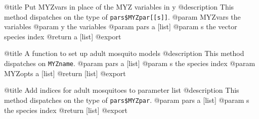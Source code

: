 \documentclass[
]{article}
\newenvironment{Shaded}{\begin{snugshade}}{\end{snugshade}}
\newcommand{\AttributeTok}[1]{\textcolor[rgb]{0.13,0.29,0.53}{#1}}
\newcommand{\ControlFlowTok}[1]{\textcolor[rgb]{0.13,0.29,0.53}{\textbf{#1}}}
\newcommand{\FunctionTok}[1]{\textcolor[rgb]{0.13,0.29,0.53}{\textbf{#1}}}
\newcommand{\NormalTok}[1]{#1}
\newcommand{\OtherTok}[1]{\textcolor[rgb]{0.56,0.35,0.01}{#1}}
\newcommand{\SpecialCharTok}[1]{\textcolor[rgb]{0.81,0.36,0.00}{\textbf{#1}}}
\newcommand{\StringTok}[1]{\textcolor[rgb]{0.31,0.60,0.02}{#1}}
\begin{document}
\begin{Shaded}
\end{Shaded}

@title Put MYZvars in place of the MYZ variables in y @description This
method dispatches on the type of \texttt{pars\$MYZpar{[}{[}s{]}{]}}.
@param MYZvars the variables @param y the variables @param pars a
{[}list{]} @param s the vector species index @return a {[}list{]}
@export

\begin{Shaded}
\end{Shaded}

@title A function to set up adult mosquito models @description This
method dispatches on \texttt{MYZname}. @param pars a {[}list{]} @param s
the species index @param MYZopts a {[}list{]} @return {[}list{]} @export

\begin{Shaded}
\end{Shaded}

@title Add indices for adult mosquitoes to parameter list @description
This method dispatches on the type of \texttt{pars\$MYZpar}. @param pars
a {[}list{]} @param s the species index @return {[}list{]} @export

\begin{Shaded}
\end{Shaded}
\end{document}
